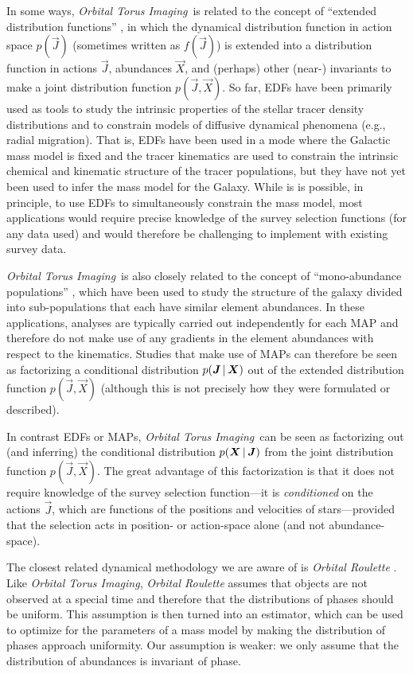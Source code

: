 \documentclass[modern]{aastex63}
\newcommand{\methodname}{\textsl{Orbital Torus Imaging}}
\begin{document}
In some ways, \methodname\ is related to the concept of ``extended distribution
functions'' \citep[EDFs; e.g.,][]{Sanders:2015,Das:2016}, in which the dynamical
distribution function in action space $p(\vec{J})$ (sometimes written as
$f(\vec{J})$) is extended into a distribution function in actions $\vec{J}$,
abundances $\vec{X}$, and (perhaps) other (near-) invariants to make a joint
distribution function $p(\vec{J},\vec{X})$.
So far, EDFs have been primarily used as tools to study the intrinsic properties
of the stellar tracer density distributions and to constrain models of diffusive
dynamical phenomena (e.g., radial migration).
That is, EDFs have been used in a mode where the Galactic mass model is fixed
and the tracer kinematics are used to constrain the intrinsic chemical and
kinematic structure of the tracer populations, but they have not yet been used
to infer the mass model for the Galaxy.
While is is possible, in principle, to use EDFs to simultaneously constrain the
mass model, most applications would require precise knowledge of the survey
selection functions (for any data used) and would therefore be challenging to
implement with existing survey data.

\methodname\ is also closely related to the concept of ``mono-abundance
populations'' \citep[MAPs; e.g.,][]{Bovy:2012, Bovy:2013, Bovy:2016,
Mackereth:2020}, which have been used to study the structure of the galaxy
divided into sub-populations that each have similar element abundances.
In these applications, analyses are typically carried out independently for each
MAP and therefore do not make use of any gradients in the element abundances
with respect to the kinematics.
Studies that make use of MAPs can therefore be seen as factorizing a conditional
distribution $p(\boldsymbol{J}\,|\,\boldsymbol{X})$ out of the extended distribution function
$p(\vec{J},\vec{X})$ (although this is not precisely how they were formulated or
described).

In contrast EDFs or MAPs, \methodname\ can be seen as factorizing out (and
inferring) the conditional distribution $p(\boldsymbol{X}\,|\,\boldsymbol{J})$ from the joint
distribution function $p(\vec{J}, \vec{X})$.
The great advantage of this factorization is that it does not require knowledge
of the survey selection function---it is \emph{conditioned} on the actions
$\vec{J}$, which are functions of the positions and velocities of
stars---provided that the selection acts in position- or action-space alone (and
not abundance-space).

The closest related dynamical methodology we are aware of is \textit{Orbital
Roulette} \citep{Beloborodov:2004}.
Like \methodname, \textit{Orbital Roulette} assumes that objects are not
observed at a special time and therefore that the distributions of phases should
be uniform.
This assumption is then turned into an estimator, which can be used to optimize
for the parameters of a mass model by making the distribution of phases approach
uniformity.
Our assumption is weaker: we only assume that the distribution of abundances is
invariant of phase.
\end{document}
